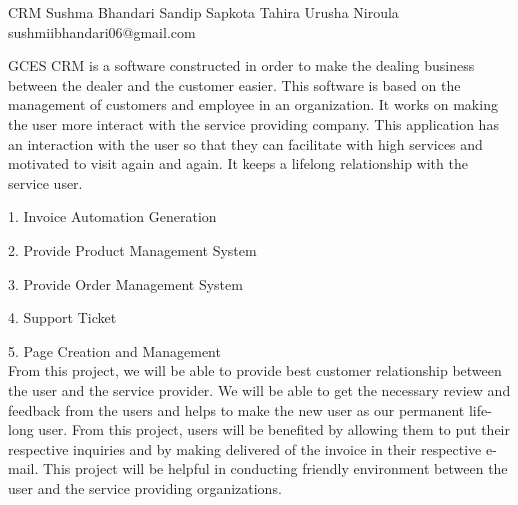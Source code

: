  \begin{conf-abstract}[]
 {CRM}
 {Sushma Bhandari
 	 Sandip Sapkota
 	  Tahira Urusha Niroula
 }
{sushmiibhandari06@gmail.com}

GCES CRM is a software constructed in order to make the dealing business between the dealer and the customer easier. This software is based on the management of customers and employee in an organization. It works on making the user more interact with the service providing company. This application has an interaction with the user so that they can facilitate with high services and motivated to visit again and again. It keeps a lifelong relationship with the service user.

1. Invoice Automation Generation

2. Provide Product Management System

3. Provide Order Management System

4. Support Ticket

5. Page Creation and Management
\\
From this project, we will be able to provide best customer relationship
between the user and the service provider. We will be able to get the
necessary review and feedback from the users and helps to make the
new user as our permanent life-long user. From this project, users will
be benefited by allowing them to put their respective inquiries and by
making delivered of the invoice in their respective e-mail. This project will
be helpful in conducting friendly environment between the user and the
service providing organizations.
 
 \end{conf-abstract}
